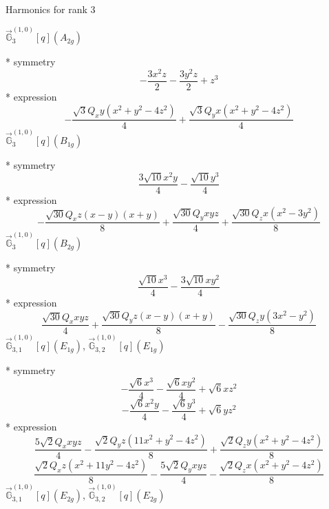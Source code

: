 \documentclass[fleqn,8pt]{jsarticle}
\begin{document}
\noindent * Harmonics for rank 3

\noindent\quad $\vec{\mathbb{G}}_{3}^{(1,0)}[q](A_{2g})$

\noindent\quad ** symmetry
\begin{dmath*}
- \frac{3 x^{2} z}{2} - \frac{3 y^{2} z}{2} + z^{3}
\end{dmath*}
\noindent\quad ** expression
\begin{dmath*}
- \frac{\sqrt{3} Q_{x} y \left(x^{2} + y^{2} - 4 z^{2}\right)}{4} + \frac{\sqrt{3} Q_{y} x \left(x^{2} + y^{2} - 4 z^{2}\right)}{4}
\end{dmath*}
\noindent\quad $\vec{\mathbb{G}}_{3}^{(1,0)}[q](B_{1g})$

\noindent\quad ** symmetry
\begin{dmath*}
\frac{3 \sqrt{10} x^{2} y}{4} - \frac{\sqrt{10} y^{3}}{4}
\end{dmath*}
\noindent\quad ** expression
\begin{dmath*}
- \frac{\sqrt{30} Q_{x} z \left(x - y\right) \left(x + y\right)}{8} + \frac{\sqrt{30} Q_{y} x y z}{4} + \frac{\sqrt{30} Q_{z} x \left(x^{2} - 3 y^{2}\right)}{8}
\end{dmath*}
\noindent\quad $\vec{\mathbb{G}}_{3}^{(1,0)}[q](B_{2g})$

\noindent\quad ** symmetry
\begin{dmath*}
\frac{\sqrt{10} x^{3}}{4} - \frac{3 \sqrt{10} x y^{2}}{4}
\end{dmath*}
\noindent\quad ** expression
\begin{dmath*}
\frac{\sqrt{30} Q_{x} x y z}{4} + \frac{\sqrt{30} Q_{y} z \left(x - y\right) \left(x + y\right)}{8} - \frac{\sqrt{30} Q_{z} y \left(3 x^{2} - y^{2}\right)}{8}
\end{dmath*}
\noindent\quad $\vec{\mathbb{G}}_{3,1}^{(1,0)}[q](E_{1g})$, $\vec{\mathbb{G}}_{3,2}^{(1,0)}[q](E_{1g})$

\noindent\quad ** symmetry
\begin{dmath*}
- \frac{\sqrt{6} x^{3}}{4} - \frac{\sqrt{6} x y^{2}}{4} + \sqrt{6} x z^{2}
\end{dmath*}
\begin{dmath*}
- \frac{\sqrt{6} x^{2} y}{4} - \frac{\sqrt{6} y^{3}}{4} + \sqrt{6} y z^{2}
\end{dmath*}
\noindent\quad ** expression
\begin{dmath*}
\frac{5 \sqrt{2} Q_{x} x y z}{4} - \frac{\sqrt{2} Q_{y} z \left(11 x^{2} + y^{2} - 4 z^{2}\right)}{8} + \frac{\sqrt{2} Q_{z} y \left(x^{2} + y^{2} - 4 z^{2}\right)}{8}
\end{dmath*}
\begin{dmath*}
\frac{\sqrt{2} Q_{x} z \left(x^{2} + 11 y^{2} - 4 z^{2}\right)}{8} - \frac{5 \sqrt{2} Q_{y} x y z}{4} - \frac{\sqrt{2} Q_{z} x \left(x^{2} + y^{2} - 4 z^{2}\right)}{8}
\end{dmath*}
\noindent\quad $\vec{\mathbb{G}}_{3,1}^{(1,0)}[q](E_{2g})$, $\vec{\mathbb{G}}_{3,2}^{(1,0)}[q](E_{2g})$
\end{document}
